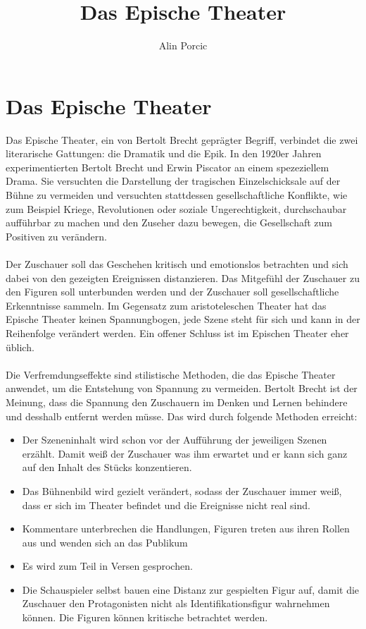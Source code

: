 \documentclass[a4paper]{article}
\title{Das Epische Theater}
\author{Alin Porcic}
\begin{document}
	\maketitle

	\newpage
	\section{Das Epische Theater}

        Das Epische Theater, ein von Bertolt Brecht geprägter Begriff, verbindet die zwei literarische Gattungen: die Dramatik und die Epik. In den 1920er Jahren experimentierten Bertolt Brecht und Erwin Piscator an einem spezeziellem Drama. Sie versuchten die Darstellung der tragischen Einzelschicksale auf der Bühne zu vermeiden und versuchten stattdessen gesellschaftliche Konflikte, wie zum Beispiel Kriege, Revolutionen oder soziale Ungerechtigkeit, durchschaubar aufführbar zu machen und den Zuseher dazu bewegen, die Gesellschaft zum Positiven zu verändern.\\\\

        Der Zuschauer soll das Geschehen kritisch und emotionslos betrachten und sich dabei von den gezeigten Ereignissen distanzieren. Das Mitgefühl der Zuschauer zu den Figuren soll unterbunden werden und der Zuschauer soll gesellschaftliche Erkenntnisse sammeln. Im Gegensatz zum aristoteleschen Theater hat das Epische Theater keinen Spannungbogen, jede Szene steht für sich und kann in der Reihenfolge verändert werden. Ein offener Schluss ist im Epischen Theater eher üblich.\\\\

	Die Verfremdungseffekte sind stilistische Methoden, die das Epische Theater anwendet, um die Entstehung von Spannung zu vermeiden. Bertolt Brecht ist der Meinung, dass die Spannung den Zuschauern im Denken und Lernen behindere und desshalb entfernt werden müsse. Das wird durch folgende Methoden erreicht:
        
        \begin{itemize}
	\item Der Szeneninhalt wird schon vor der Aufführung der jeweiligen Szenen erzählt. Damit weiß der Zuschauer was ihm erwartet und er kann sich ganz auf den Inhalt des Stücks konzentieren.
        \item Das Bühnenbild wird gezielt verändert, sodass der Zuschauer immer weiß, dass er sich im Theater befindet und die Ereignisse nicht real sind.
        \item Kommentare unterbrechen die Handlungen, Figuren treten aus ihren Rollen aus und wenden sich an das Publikum
        \item Es wird zum Teil in Versen gesprochen.
        \item Die Schauspieler selbst bauen eine Distanz zur gespielten Figur auf, damit die Zuschauer den Protagonisten nicht als Identifikationsfigur wahrnehmen können. Die Figuren können kritische betrachtet werden.
        \end{itemize}
        
\end{document}
